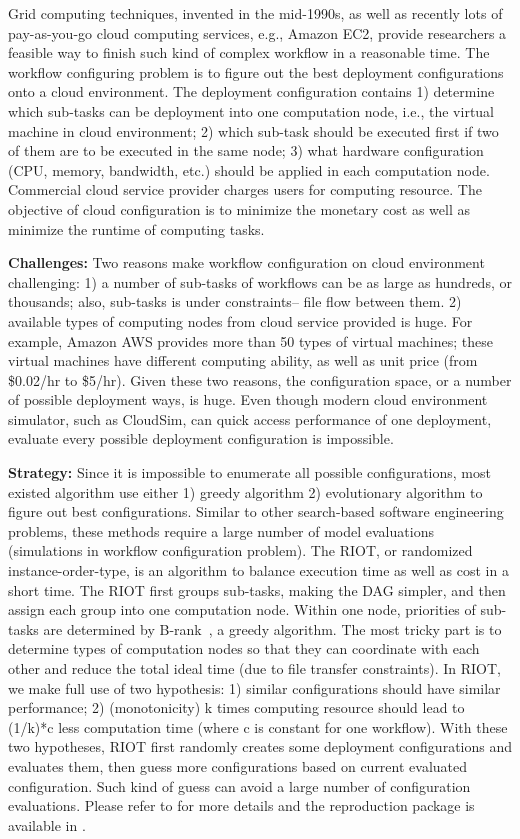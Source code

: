\documentclass[sigconf,anonymous,review]{acmart}
\begin{document}
Grid computing techniques, invented in the mid-1990s, as well as recently lots of pay-as-you-go cloud computing services, e.g., Amazon EC2, provide researchers a feasible way to finish such kind of complex workflow in a reasonable time.
The workflow configuring problem is to figure out the best deployment configurations onto a cloud environment. The deployment configuration
contains 1) determine which sub-tasks can be deployment into
one computation node, i.e., the virtual machine in cloud environment; 2) which sub-task should be executed first if two of them are to be executed in the same node; 3) what hardware configuration (CPU, memory, bandwidth, etc.) should be applied in each computation node. Commercial cloud service provider charges users for computing resource. 
The objective of cloud configuration is to minimize the monetary cost as well as minimize the runtime of computing tasks.


\noindent\textbf{Challenges: } 
Two reasons make workflow configuration on cloud environment challenging: 1)  a number of sub-tasks of workflows can be as large as hundreds, or thousands; also, sub-tasks is under constraints-- file flow between them. 2) available types of
computing nodes from cloud service provided is huge.
For example, Amazon AWS provides more than 50 types of virtual machines; these
virtual machines have different computing ability, as well as unit price (from \$0.02/hr to \$5/hr).
Given these two reasons,
the configuration space, or a number of possible deployment ways, is huge.
Even though modern cloud environment simulator, such as CloudSim, can quick
access performance of one deployment, evaluate every
possible deployment configuration is impossible.

\noindent\textbf{Strategy:} 
Since it is impossible to enumerate all possible configurations, most existed algorithm use either 1) greedy algorithm 2) evolutionary algorithm to figure out best configurations.
Similar to other search-based software engineering problems,
these methods require a large number of model evaluations (simulations in workflow configuration problem).
The RIOT, or randomized instance-order-type, is an algorithm to balance execution time as well as cost
in a short time.
The RIOT first groups sub-tasks, making the DAG simpler, and then
assign each group into one computation node. Within one node,
priorities of sub-tasks are determined by
B-rank~\cite{topcuoglu2002performance}, a greedy algorithm. 
The most tricky part is to determine types of computation nodes so that they can coordinate with each other and reduce the total ideal time (due to file transfer constraints).
In RIOT,
we make full use of two hypothesis: 1) similar configurations should have similar performance; 2) (monotonicity) k times computing resource should lead to (1/k)*c less computation time (where c is constant for one workflow).
With these two hypotheses,
RIOT first randomly creates some deployment configurations and evaluates them, then guess more configurations based on current evaluated configuration. Such kind of guess can avoid a large number of configuration evaluations. Please refer to \cite{chen2017riot} for more details and the reproduction package is available in .
\end{document}
